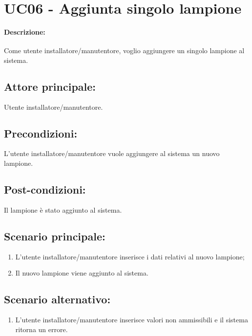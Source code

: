 \section{UC06 - Aggiunta singolo lampione}

\paragraph{Descrizione:}
Come utente installatore/manutentore, voglio aggiungere un singolo lampione al sistema.

\subsection{Attore principale:}
Utente installatore/manutentore.

\subsection{Precondizioni:}
L'utente installatore/manutentore vuole aggiungere al sistema un nuovo lampione.

\subsection{Post-condizioni:}
Il lampione è stato aggiunto al sistema.

\subsection{Scenario principale:}
\begin{enumerate}
    \item L'utente installatore/manutentore inserisce i dati relativi al nuovo lampione;
    \item Il nuovo lampione viene aggiunto al sistema.
\end{enumerate}

\subsection{Scenario alternativo:}
\begin{enumerate}
    \item L'utente installatore/manutentore inserisce valori non ammissibili e il sistema ritorna un errore.
\end{enumerate}